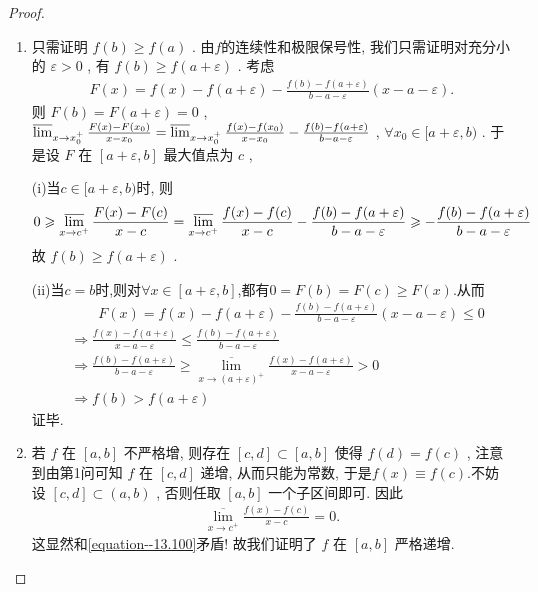 \documentclass[../../main.tex]{subfiles}
\begin{document}
\begin{proof}
\begin{enumerate}
\item 只需证明 \(f(b) \geqslant  f(a)\) . 由$f$的连续性和极限保号性, 我们只需证明对充分小的 \(\varepsilon > 0\) , 有 \(f(b) \geqslant  f(a + \varepsilon)\) . 考虑
\begin{align*}
F(x) = f(x) - f(a + \varepsilon) - \frac{f(b) - f(a + \varepsilon)}{b - a - \varepsilon}(x - a - \varepsilon).
\end{align*}
则
\(F(b) = F(a + \varepsilon) = 0\) , \(\varlimsup_{x \to x_0^+} \frac{F(x) - F(x_0)}{x - x_0} = \varlimsup_{x \to x_0^+} \frac{f(x) - f(x_0)}{x - x_0} - \frac{f(b) - f(a + \varepsilon)}{b - a - \varepsilon}\) , \(\forall x_0 \in [a + \varepsilon, b)\) .
于是设 \(F\) 在 \([a + \varepsilon, b]\) 最大值点为 \(c \) ,

(i)当$c\in [a + \varepsilon, b)$时, 则
\begin{align*}
0 \geqslant  \varlimsup_{x \to c^+} \frac{F(x) - F(c)}{x - c} = \varlimsup_{x \to c^+} \frac{f(x) - f(c)}{x - c} - \frac{f(b) - f(a + \varepsilon)}{b - a - \varepsilon} \geqslant  - \frac{f(b) - f(a + \varepsilon)}{b - a - \varepsilon}
\end{align*}
故 \(f(b) \geqslant  f(a + \varepsilon)\) . 

(ii)当$c=b$时,则对$\forall x\in [a+\varepsilon,b]$,都有$0=F(b)=F(c)\geqslant F(x)$.从而
\begin{align*}
&\quad \quad F(x)=f(x)-f(a+\varepsilon )-\frac{f(b)-f(a+\varepsilon )}{b-a-\varepsilon}(x-a-\varepsilon )\leqslant 0
\\
&\Rightarrow \frac{f(x)-f(a+\varepsilon )}{x-a-\varepsilon}\leqslant \frac{f(b)-f(a+\varepsilon )}{b-a-\varepsilon}
\\
&\Rightarrow \frac{f(b)-f(a+\varepsilon )}{b-a-\varepsilon}\geqslant \underset{x\rightarrow \left( a+\varepsilon \right) ^+}{\overline{\lim }}\frac{f(x)-f(a+\varepsilon )}{x-a-\varepsilon}>0
\\
&\Rightarrow f(b)>f(a+\varepsilon )
\end{align*}
证毕.

\item 若 \(f\) 在 \([a, b]\) 不严格增, 则存在 \([c, d] \subset [a, b]\) 使得 \(f(d) = f(c)\) , 注意到由第1问可知 \(f\) 在 \([c, d]\) 递增, 从而只能为常数, 于是$f(x)\equiv f(c)$.不妨设 \([c, d] \subset (a, b)\) , 否则任取 \([a, b]\) 一个子区间即可. 因此
\begin{align*}
\underset{x\rightarrow c^+}{\overline{\lim }}\frac{f(x)-f(c)}{x-c}=0.
\end{align*}
这显然和\eqref{equation--13.100}矛盾! 故我们证明了 \(f\) 在 \([a, b]\) 严格递增.


\end{enumerate}
\end{proof}
\end{document}
